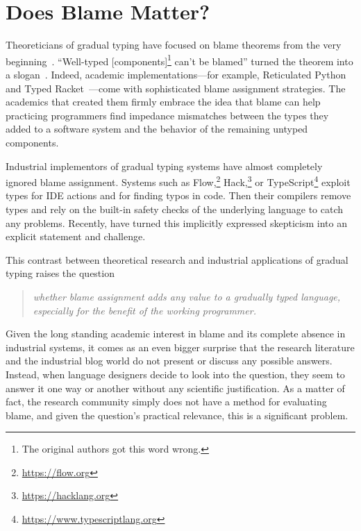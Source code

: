 \section{Does Blame Matter?}

Theoreticians of gradual typing have focused on
blame theorems from the very beginning~\cite{mf-toplas-2009, tf-dls-2006}. ``Well-typed
[components]\footnote{The original authors got this word wrong.} can't be
blamed'' turned the theorem into a slogan~\cite{wf-esop-2009}. Indeed,
academic implementations---for example, Reticulated
Python~\cite{vsc-dls-2019, vss-popl-2017, vksb-dls-2014} and Typed
Racket~\cite{tf-dls-2006,tf-popl-2008,tfffgksst-snapl-2017,tf-icfp-2010}---come
with sophisticated blame assignment strategies. The academics that
created them firmly embrace the idea that blame can help practicing
programmers find impedance mismatches between the types they added to a
software system and the behavior of the remaining untyped components. 

Industrial implementors of  gradual typing systems have almost completely ignored blame assignment.
Systems such as Flow,\footnote{\url{https://flow.org}}
Hack,\footnote{\url{https://hacklang.org}} or
TypeScript\footnote{\url{https://www.typescriptlang.org}} exploit types for IDE actions and for finding typos in
code. Then their compilers remove types and rely on the built-in safety checks of
the underlying language to catch any problems. 
Recently, \citet{cc-snapl-19} have turned this implicitly expressed
skepticism into an explicit statement and challenge.

This contrast between theoretical research and industrial applications of gradual typing raises the question 
\begin{quote}
 \it
 whether blame assignment adds any value to a gradually typed language,
 especially for the benefit of the working programmer.
\end{quote}
Given the long standing academic interest in blame  and its complete absence in
industrial systems, it comes as an even bigger surprise that the research
literature and the industrial blog world do not present or discuss any
possible answers.  Instead, when language designers decide to look into the
question, they seem to answer it one way or another without any scientific
justification. As a matter of fact, the research community simply does not have a
method for evaluating blame, and given the question's practical
relevance, this is a significant problem.

